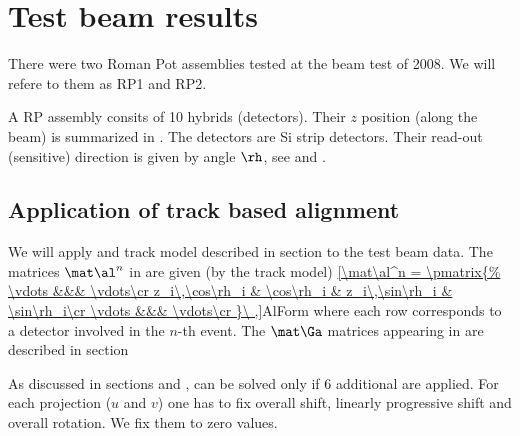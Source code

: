 \chapter{Test beam results}

There were two Roman Pot assemblies tested at the beam test of 2008. We will refere to them as RP1 and RP2.

A RP assembly consits of 10 hybrids (detectors). Their $z$ position (along the beam) is summarized in . The detectors are Si strip detectors. Their read-out (sensitive) direction is given by angle $\rh$, see  and .

\bmcent
{}
\hfil

\emcent


\section[AppTBAlign]{Application of track based alignment}

We will apply  and track model described in section  to the test beam data. The matrices $\mat\al^n$ in  are given (by the track model)
\eqref{\mat\al^n = \pmatrix{%
\vdots &&& \vdots\cr
z_i\,\cos\rh_i & \cos\rh_i & z_i\,\sin\rh_i & \sin\rh_i\cr
\vdots &&& \vdots\cr
}\ ,}{AlForm}
where each row corresponds to a detector involved in the $n$-th event. The $\mat\Ga$ matrices appearing in  are described in section 

As discussed in sections  and ,  can be solved only if 6 additional are applied. For each projection ($u$ and $v$) one has to fix
\bitm\itskip-2mm
\itm overall shift,
\itm linearly progressive shift and
\itm overall rotation.
\eitm
We fix them to zero values.

